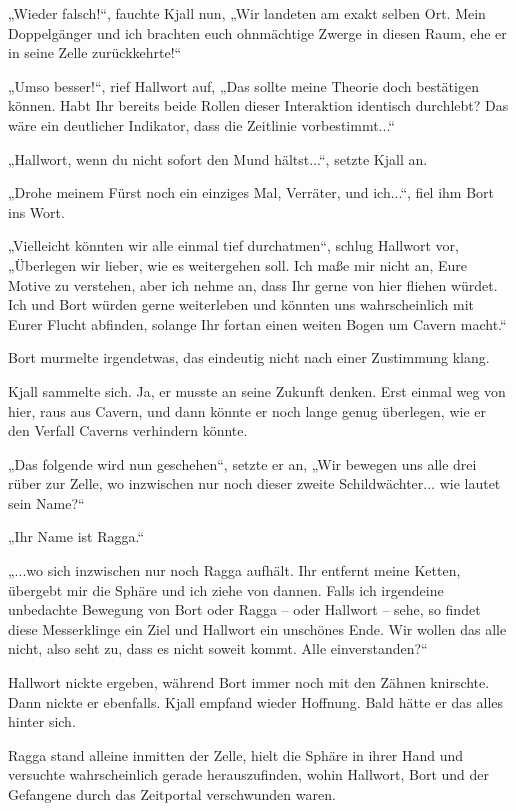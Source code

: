 „Wieder falsch!“, fauchte Kjall nun, „Wir landeten am exakt selben Ort. Mein Doppelgänger und ich brachten euch ohnmächtige Zwerge in diesen Raum, ehe er in seine Zelle zurückkehrte!“

„Umso besser!“, rief Hallwort auf, „Das sollte meine Theorie doch bestätigen können. Habt Ihr bereits beide Rollen dieser Interaktion identisch durchlebt? Das wäre ein deutlicher Indikator, dass die Zeitlinie vorbestimmt...“

„Hallwort, wenn du nicht sofort den Mund hältst...“, setzte Kjall an.

„Drohe meinem Fürst noch ein einziges Mal, Verräter, und ich...“, fiel ihm Bort ins Wort.

„Vielleicht könnten wir alle einmal tief durchatmen“, schlug Hallwort vor, „Überlegen wir lieber, wie es weitergehen soll. Ich maße mir nicht an, Eure Motive zu verstehen, aber ich nehme an, dass Ihr gerne von hier fliehen würdet. Ich und Bort würden gerne weiterleben und könnten uns wahrscheinlich mit Eurer Flucht abfinden, solange Ihr fortan einen weiten Bogen um Cavern macht.“

Bort murmelte irgendetwas, das eindeutig nicht nach einer Zustimmung klang.

Kjall sammelte sich. Ja, er musste an seine Zukunft denken. Erst einmal weg von hier, raus aus Cavern, und dann könnte er noch lange genug überlegen, wie er den Verfall Caverns verhindern könnte.

„Das folgende wird nun geschehen“, setzte er an, „Wir bewegen uns alle drei rüber zur Zelle, wo inzwischen nur noch dieser zweite Schildwächter... wie lautet sein Name?“

„Ihr Name ist Ragga.“

„...wo sich inzwischen nur noch Ragga aufhält. Ihr entfernt meine Ketten, übergebt mir die Sphäre und ich ziehe von dannen. Falls ich irgendeine unbedachte Bewegung von Bort oder Ragga – oder Hallwort – sehe, so findet diese Messerklinge ein Ziel und Hallwort ein unschönes Ende. Wir wollen das alle nicht, also seht zu, dass es nicht soweit kommt. Alle einverstanden?“

Hallwort nickte ergeben, während Bort immer noch mit den Zähnen knirschte. Dann nickte er ebenfalls. Kjall empfand wieder Hoffnung. Bald hätte er das alles hinter sich.

Ragga stand alleine inmitten der Zelle, hielt die Sphäre in ihrer Hand und versuchte wahrscheinlich gerade herauszufinden, wohin Hallwort, Bort und der Gefangene durch das Zeitportal verschwunden waren.

